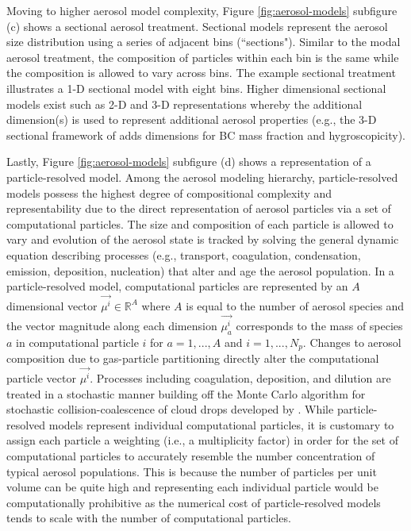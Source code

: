 Moving to higher aerosol model complexity, Figure \ref{fig:aerosol-models} subfigure (c) shows a sectional aerosol treatment. Sectional models represent the aerosol size distribution using a series of adjacent bins (``sections"). Similar to the modal aerosol treatment, the composition of particles within each bin is the same while the composition is allowed to vary across bins. The example sectional treatment illustrates a 1-D sectional model with eight bins. Higher dimensional sectional models exist such as 2-D and 3-D representations whereby the additional dimension(s) is used to represent additional aerosol properties (e.g., the 3-D sectional framework of \cite{ching_three-dimensional_2016} adds dimensions for BC mass fraction and hygroscopicity).

Lastly, Figure \ref{fig:aerosol-models} subfigure (d) shows a representation of a particle-resolved model. Among the aerosol modeling hierarchy, particle-resolved models possess the highest degree of compositional complexity and representability due to the direct representation of aerosol particles via a set of computational particles. The size and composition of each particle is allowed to vary and evolution of the aerosol state is tracked by solving the general dynamic equation describing processes (e.g., transport, coagulation, condensation, emission, deposition, nucleation) that alter and age the aerosol population. In a particle-resolved model, computational particles are represented by an $A$ dimensional vector $\vec{\mu^i}\in \mathbb{R}^A$ where $A$ is equal to the number of aerosol species and the vector magnitude along each dimension $\vec{\mu_a^i}$ corresponds to the mass of species $a$ in computational particle $i$ for $a=1,...,A$ and $i=1,...,N_p$. Changes to aerosol composition due to gas-particle partitioning directly alter the computational particle vector $\vec{\mu^i}$. Processes including coagulation, deposition, and dilution are treated in a stochastic manner building off the Monte Carlo algorithm for stochastic collision-coalescence of cloud drops developed by \cite{gillespie_exact_1975}. While particle-resolved models represent individual computational particles, it is customary to assign each particle a weighting (i.e., a multiplicity factor) in order for the set of computational particles to accurately resemble the number concentration of typical aerosol populations. This is because the number of particles per unit volume can be quite high and representing each individual particle would be computationally prohibitive as the numerical cost of particle-resolved models tends to scale with the number of computational particles. 

